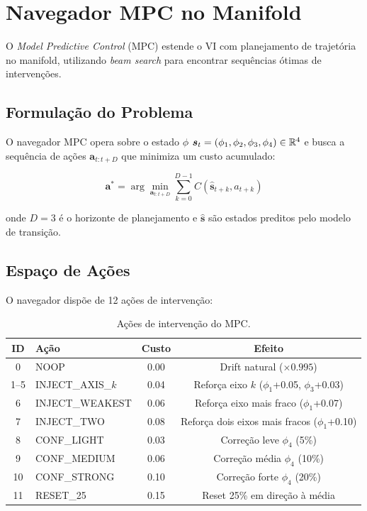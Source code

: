 
\section{Navegador MPC no Manifold}
\label{sec:mpc}

O \textit{Model Predictive Control} (MPC) estende o VI com planejamento
de trajet\'oria no manifold, utilizando \textit{beam search} para encontrar
sequ\^encias \'otimas de interven\c{c}\~oes.

\subsection{Formula\c{c}\~ao do Problema}

O navegador MPC opera sobre o estado $\phi$
$\bm{s}_t = (\phi_1, \phi_2, \phi_3, \phi_4) \in \mathbb{R}^4$
e busca a sequ\^encia de a\c{c}\~oes $\bm{a}_{t:t+D}$ que minimiza um custo
acumulado:

\begin{equation}
    \bm{a}^* = \arg\min_{\bm{a}_{t:t+D}} \sum_{k=0}^{D-1} C(\hat{\bm{s}}_{t+k}, a_{t+k})
    \label{eq:mpc_objective}
\end{equation}

onde $D = 3$ \'e o horizonte de planejamento e $\hat{\bm{s}}$ s\~ao estados
preditos pelo modelo de transi\c{c}\~ao.

\subsection{Espa\c{c}o de A\c{c}\~oes}

O navegador disp\~oe de 12 a\c{c}\~oes de interven\c{c}\~ao:

\begin{table}[H]
\centering
\caption{A\c{c}\~oes de interven\c{c}\~ao do MPC.}
\label{tab:mpc_actions}
\begin{tabular}{clcc}
\toprule
\textbf{ID} & \textbf{A\c{c}\~ao} & \textbf{Custo} & \textbf{Efeito} \\
\midrule
0 & NOOP & 0.00 & Drift natural ($\times 0.995$) \\
1--5 & INJECT\_AXIS\_$k$ & 0.04 & Refor\c{c}a eixo $k$ ($\phi_1$+0.05, $\phi_3$+0.03) \\
6 & INJECT\_WEAKEST & 0.06 & Refor\c{c}a eixo mais fraco ($\phi_1$+0.07) \\
7 & INJECT\_TWO & 0.08 & Refor\c{c}a dois eixos mais fracos ($\phi_1$+0.10) \\
8 & CONF\_LIGHT & 0.03 & Corre\c{c}\~ao leve $\phi_4$ (5\%) \\
9 & CONF\_MEDIUM & 0.06 & Corre\c{c}\~ao m\'edia $\phi_4$ (10\%) \\
10 & CONF\_STRONG & 0.10 & Corre\c{c}\~ao forte $\phi_4$ (20\%) \\
11 & RESET\_25 & 0.15 & Reset 25\% em dire\c{c}\~ao \`a m\'edia \\
\bottomrule
\end{tabular}
\end{table}

